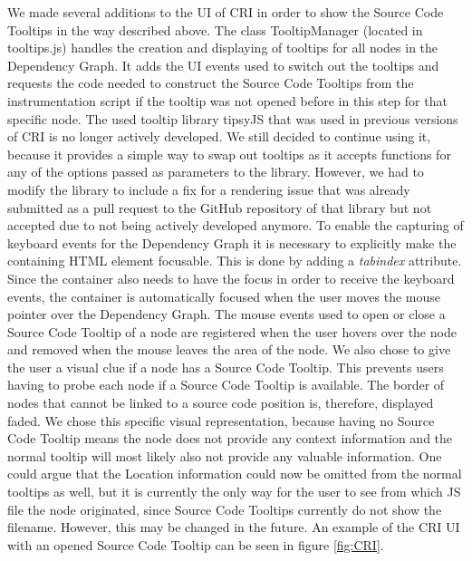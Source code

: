 We made several additions to the UI of CRI in order to show the Source Code Tooltips in the way described above. The class TooltipManager (located in tooltips.js) handles the creation and displaying of tooltips for all nodes in the Dependency Graph. It adds the UI events used to switch out the tooltips and requests the code needed to construct the Source Code Tooltips from the instrumentation script if the tooltip was not opened before in this step for that specific node. The used tooltip library tipsyJS \cite{Tipsy} that was used in previous versions of CRI is no longer actively developed. We still decided to continue using it, because it provides a simple way to swap out tooltips as it accepts functions for any of the options passed as parameters to the library. However, we had to modify the library to include a fix for a rendering issue that was already submitted as a pull request to the GitHub repository of that library but not accepted due to not being actively developed anymore. To enable the capturing of keyboard events for the Dependency Graph it is necessary to explicitly make the containing HTML element focusable. This is done by adding a \emph{tabindex} attribute. Since the container also needs to have the focus in order to receive the keyboard events, the container is automatically focused when the user moves the mouse pointer over the Dependency Graph. The mouse events used to open or close a Source Code Tooltip of a node are registered when the user hovers over the node and removed when the mouse leaves the area of the node. We also chose to give the user a visual clue if a node has a Source Code Tooltip. This prevents users having to probe each node if a Source Code Tooltip is available. The border of nodes that cannot be linked to a source code position is, therefore, displayed faded. We chose this specific visual representation, because having no Source Code Tooltip means the node does not provide any context information and the normal tooltip will most likely also not provide any valuable information. One could argue that the Location information could now be omitted from the normal tooltips as well, but it is currently the only way for the user to see from which JS file the node originated, since Source Code Tooltips currently do not show the filename. However, this may be changed in the future. An example of the CRI UI with an opened Source Code Tooltip can be seen in figure \ref{fig:CRI}.
	

